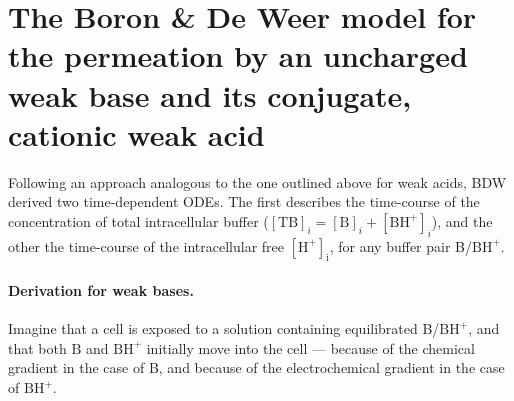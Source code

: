 \documentclass[fleqn,10pt]{physiome}
\begin{document}
\section{The Boron \& De Weer model for the permeation by an uncharged weak base and its conjugate, cationic weak acid}

Following an approach analogous to the one outlined above for weak acids, BDW derived two time-dependent ODEs. The first describes the time-course of the concentration of total intracellular buffer ($[\mathrm{TB}]_i = [\mathrm{B}]_i+[\mathrm{BH^+}]_i$), and the other the time-course of the intracellular free $\mathrm{[H^+]_i}$, for any buffer pair B/$\mathrm{BH^+}$.


\paragraph{Derivation for weak bases.}

Imagine that a cell is exposed to a solution containing equilibrated B/$\mathrm{BH^+}$, and that both $\mathrm{B}$ and $\mathrm{BH^+}$ initially move into the cell --- because of the chemical gradient in the case of B, and because of the electrochemical gradient in the case of $\mathrm{BH^+}$.\\
\end{document}
